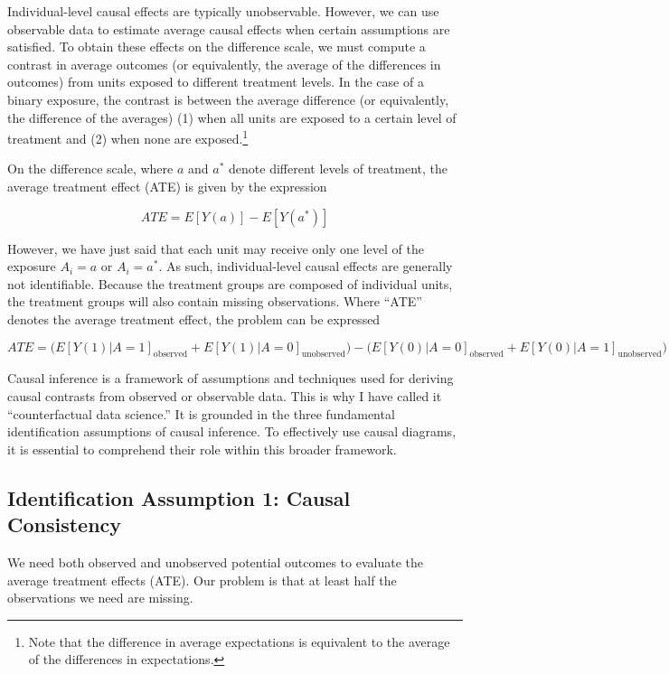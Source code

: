 \documentclass[
  singlecolumn]{report}
\begin{document}
Individual-level causal effects are typically unobservable. However, we
can use observable data to estimate average causal effects when certain
assumptions are satisfied. To obtain these effects on the difference
scale, we must compute a contrast in average outcomes (or equivalently,
the average of the differences in outcomes) from units exposed to
different treatment levels. In the case of a binary exposure, the
contrast is between the average difference (or equivalently, the
difference of the averages) (1) when all units are exposed to a certain
level of treatment and (2) when none are exposed.\footnote{Note that the
  difference in average expectations is equivalent to the average of the
  differences in expectations.}

On the difference scale, where \(a\) and \(a^*\) denote different levels
of treatment, the average treatment effect (ATE) is given by the
expression

\[
ATE = E[Y(a)] - E[Y(a^*)]
\]

However, we have just said that each unit may receive only one level of
the exposure \(A_i = a\) or \(A_i = a^*\). As such, individual-level
causal effects are generally not identifiable. Because the treatment
groups are composed of individual units, the treatment groups will also
contain missing observations. Where ``ATE'' denotes the average
treatment effect, the problem can be expressed

\[
ATE = \bigg(E[Y(1)|A = 1]_{\text{observed}} + E[Y(1)|A = 0]_{\text{unobserved}}\bigg) - \bigg(E[Y(0)|A = 0]_{\text{observed}}  + E[Y(0)|A = 1]_{\text{unobserved}}\bigg)
\]

Causal inference is a framework of assumptions and techniques used for
deriving causal contrasts from observed or observable data. This is why
I have called it ``counterfactual data science.'' It is grounded in the
three fundamental identification assumptions of causal inference. To
effectively use causal diagrams, it is essential to comprehend their
role within this broader framework.

\hypertarget{identification-assumption-1-causal-consistency}{%
\subsection{Identification Assumption 1: Causal
Consistency}\label{identification-assumption-1-causal-consistency}}

We need both observed and unobserved potential outcomes to evaluate the
average treatment effects (ATE). Our problem is that at least half the
observations we need are missing.
\end{document}
